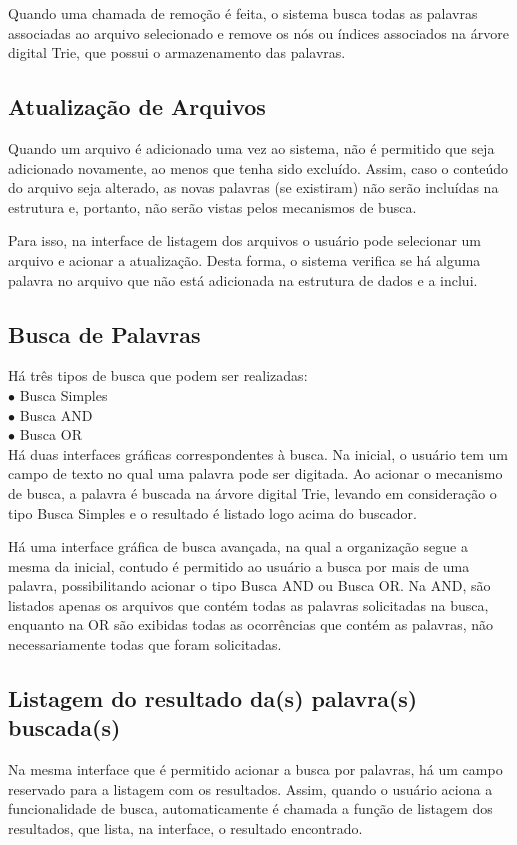 \documentclass[12pt]{article}
\begin{document}
	Quando uma chamada de remoção é feita, o sistema busca todas as palavras associadas ao arquivo selecionado e remove os nós ou índices associados na árvore digital Trie, que possui o armazenamento das palavras.

\subsection{Atualização de Arquivos}
Quando um arquivo é adicionado uma vez ao sistema, não é permitido que seja adicionado novamente, ao menos que tenha sido excluído. Assim, caso o conteúdo do arquivo seja alterado, as novas palavras (se existiram) não serão incluídas na estrutura e, portanto, não serão vistas pelos mecanismos de busca.

	Para isso, na interface de listagem dos arquivos o usuário pode selecionar um arquivo e acionar a atualização. Desta forma, o sistema verifica se há alguma palavra no arquivo que não está adicionada na estrutura de dados e a inclui.

\subsection{Busca de Palavras}
Há três tipos de busca que podem ser realizadas: \\
$\bullet$ Busca Simples\\
$\bullet$ Busca AND\\
$\bullet$ Busca OR\\

Há duas interfaces gráficas correspondentes à busca. Na inicial, o usuário tem um campo de texto no qual uma palavra pode ser digitada. Ao acionar o mecanismo de busca, a palavra é buscada na árvore digital Trie, levando em consideração o tipo Busca Simples e o resultado é listado logo acima do buscador.

Há uma interface gráfica de busca avançada, na qual a organização segue a mesma da inicial, contudo é permitido ao usuário a busca por mais de uma palavra, possibilitando acionar o tipo Busca AND ou Busca OR. Na AND, são listados apenas os arquivos que contém todas as palavras solicitadas na busca, enquanto na OR são exibidas todas as ocorrências que contém as palavras, não necessariamente todas que foram solicitadas.

\subsection{Listagem do resultado da(s) palavra(s) buscada(s)}
Na mesma interface que é permitido acionar a busca por palavras, há um campo reservado para a listagem com os resultados. Assim, quando o usuário aciona a funcionalidade de busca, automaticamente é chamada a função de listagem dos resultados, que lista, na interface, o resultado encontrado.
\end{document}

